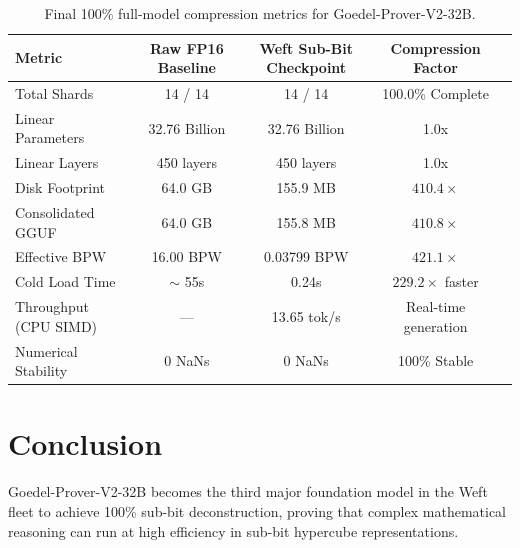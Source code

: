 \documentclass[11pt,a4paper]{article}
\begin{document}
\begin{table}[h]
\centering
\begin{tabular}{lcccc}
\toprule
\textbf{Metric} & \textbf{Raw FP16 Baseline} & \textbf{Weft Sub-Bit Checkpoint} & \textbf{Compression Factor} \\
\midrule
Total Shards & 14 / 14 & 14 / 14 & 100.0\% Complete \\
Linear Parameters & 32.76 Billion & 32.76 Billion & 1.0x \\
Linear Layers & 450 layers & 450 layers & 1.0x \\
Disk Footprint & 64.0 GB & 155.9 MB & $410.4\times$ \\
Consolidated GGUF & 64.0 GB & 155.8 MB & $410.8\times$ \\
Effective BPW & 16.00 BPW & 0.03799 BPW & $421.1\times$ \\
Cold Load Time & $\sim$ 55s & 0.24s & $229.2\times$ faster \\
Throughput (CPU SIMD) & --- & 13.65 tok/s & Real-time generation \\
Numerical Stability & 0 NaNs & 0 NaNs & 100\% Stable \\
\bottomrule
\end{tabular}
\caption{Final 100\% full-model compression metrics for Goedel-Prover-V2-32B.}
\label{tab:goedel_results}
\end{table}

\section{Conclusion}
Goedel-Prover-V2-32B becomes the third major foundation model in the Weft fleet to achieve 100\% sub-bit deconstruction, proving that complex mathematical reasoning can run at high efficiency in sub-bit hypercube representations.
\end{document}
